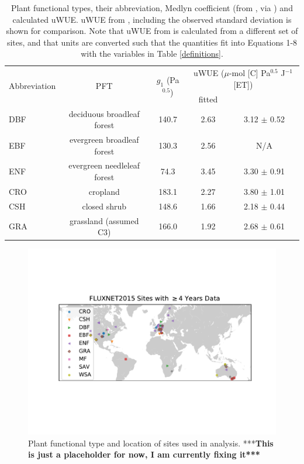 \documentclass[draft,linenumbers]{gcbjournal}
\begin{document}
\begin{table}
  \caption{Plant functional types, their abbreviation, Medlyn coefficient (from \citet{Lin_2015}, via \citet{Franks_2017}) and calculated uWUE. uWUE from \citet{Zhou_2015}, including the  observed standard deviation is shown for comparison. Note that uWUE from \citet{Zhou_2015} is calculated from a different set of sites, and that units are converted such that the quantities fit into Equations 1-8 with the variables in Table \ref{definitions}.}
    \small
\label{pft}
\centering
\begin{tabular}{l c c @{\qquad} c c}
  \hline
  \multirow{2}[3]{*}{Abbreviation} & \multirow{2}[3]{*}{PFT} & \multirow{2}[3]{*}{$g_1$ (Pa$^{0.5}$)} & \multicolumn{2}{c}{uWUE ($\mu$-mol [C] Pa$^{0.5}$ J$^{-1}$ [ET])}  \\
  \cmidrule{4-5}

  & & & fitted & \citet{Zhou_2015} \\

  \hline
  DBF & deciduous broadleaf forest & 140.7 & 2.63 & 3.12 $\pm$ 0.52 \\
  EBF & evergreen broadleaf forest & 130.3 & 2.56 &  N/A \\
  ENF & evergreen needleleaf forest & 74.3 & 3.45 & 3.30 $\pm$ 0.91 \\
  CRO & cropland & 183.1 & 2.27 & 3.80 $\pm$ 1.01 \\
  CSH & closed shrub & 148.6 & 1.66 & 2.18 $\pm$ 0.44 \\
  GRA & grassland (assumed C3) & 166.0 & 1.92 & 2.68 $\pm$ 0.61 \\
\hline
\end{tabular}
\end{table}


\begin{figure}
\centering
\includegraphics[width=\textwidth]{./map.pdf}
\caption{Plant functional type and location of sites used in analysis. ***\textbf{This is just  a placeholder for now, I am currently fixing it***}}
\label{map_fig}
 \end{figure}
\end{document}
